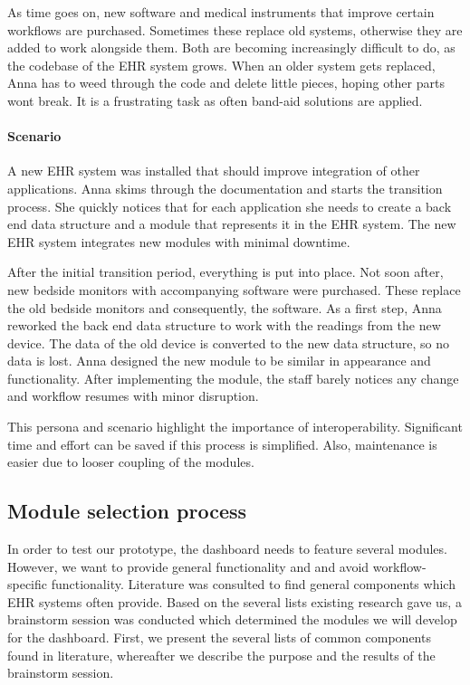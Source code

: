         As time goes on, new software and medical instruments that improve certain workflows are purchased. Sometimes these replace old systems, otherwise they are added to work alongside them. Both are becoming increasingly difficult to do, as the codebase of the EHR system grows. When an older system gets replaced, Anna has to weed through the code and delete little pieces, hoping other parts wont break. It is a frustrating task as often band-aid solutions are applied.

        \paragraph{Scenario} A new EHR system was installed that should improve integration of other applications. Anna skims through the documentation and starts the transition process. She quickly notices that for each application she needs to create a back end data structure and a module that represents it in the EHR system. The new EHR system integrates new modules with minimal downtime.

        After the initial transition period, everything is put into place. Not soon after, new bedside monitors with accompanying software were purchased. These replace the old bedside monitors and consequently, the software. As a first step, Anna reworked the back end data structure to work with the readings from the new device. The data of the old device is converted to the new data structure, so no data is lost. Anna designed the new module to be similar in appearance and functionality. After implementing the module, the staff barely notices any change and workflow resumes with minor disruption.\bigskip

        \noindent This persona and scenario highlight the importance of interoperability. Significant time and effort can be saved if this process is simplified. Also, maintenance is easier due to looser coupling of the modules.

    \subsection{Module selection process}\label{module_brainstorm}

    In order to test our prototype, the dashboard needs to feature several modules. However, we want to provide general functionality and and avoid workflow-specific functionality. Literature was consulted to find general components which EHR systems often provide. Based on the several lists existing research gave us, a brainstorm session was conducted which determined the modules we will develop for the dashboard. First, we present the several lists of common components found in literature, whereafter we describe the purpose and the results of the brainstorm session.

